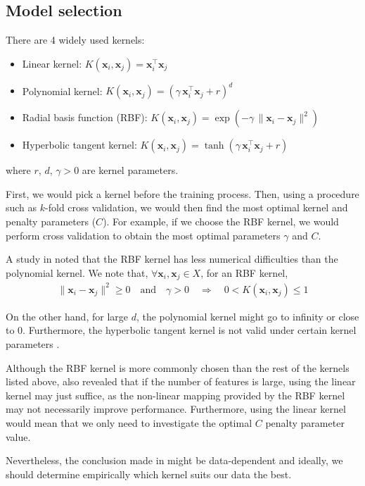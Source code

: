 \documentclass[12pt, twoside, a4paper]{report}
\def\vec{\boldsymbol}
\begin{document}
\subsection{Model selection} \label{bg:ml:svm:model}
There are 4 widely used kernels:
\begin{itemize}
\item Linear kernel: $K(\vec{x}_i, \vec{x}_j) = \vec{x}_i^\top \vec{x}_j$
\item Polynomial kernel: $K(\vec{x}_i, \vec{x}_j) = (\gamma \, \vec{x}_i^\top \vec{x}_j + r)^d$
\item Radial basis function (RBF): $K(\vec{x}_i, \vec{x}_j) = \exp(-\gamma \, \| \vec{x}_i - \vec{x}_j \|^2)$
\item Hyperbolic tangent kernel: $K(\vec{x}_i, \vec{x}_j) = \tanh(\gamma \, \vec{x}_i^\top \vec{x}_j + r)$
\end{itemize}
where $r$, $d$, $\gamma>0$ are kernel parameters.

First, we would pick a kernel before the training process. Then, using a procedure such as $k$-fold cross validation, we would then find the most optimal kernel and penalty parameters ($C$). For example, if we choose the RBF kernel, we would  perform cross validation to obtain the most optimal parameters $\gamma$ and $C$.

A study in \cite{RefWorks:128} noted that the RBF kernel has less numerical difficulties than the polynomial kernel. We note that, $\forall \vec{x}_i, \vec{x}_j \in X$, for an RBF kernel,
\begin{align*}
\| \vec{x}_i - \vec{x}_j \|^2 \geq 0 \quad \text{and} \quad \gamma > 0 \quad \Rightarrow \quad 0 < K(\vec{x}_i, \vec{x}_j) \leq 1 
\end{align*}

On the other hand, for large $d$, the polynomial kernel might go to infinity or close to 0. Furthermore, the hyperbolic tangent kernel is not valid under certain kernel parameters \cite{RefWorks:254}.

Although the RBF kernel is more commonly chosen than the rest of the kernels listed above, \cite{RefWorks:128} also revealed that if the number of features is large, using the linear kernel may just suffice, as the non-linear mapping provided by the RBF kernel may not necessarily improve performance. Furthermore, using the linear kernel would mean that we only need to investigate the optimal $C$ penalty parameter value.

Nevertheless, the conclusion made in \cite{RefWorks:128} might be data-dependent and ideally, we should determine empirically which kernel suits our data the best.
\end{document}
